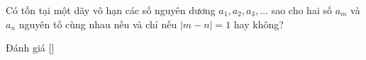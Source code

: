 \ifshowproblem
\begin{problem}\label{problem:RMM-2015-P1}
    Có tồn tại một dãy vô hạn các số nguyên dương \( a_1, a_2, a_3, \ldots \)
    sao cho hai số \( a_m \) và \( a_n \) nguyên tố cùng nhau nếu và chỉ nếu \( |m - n| = 1 \) hay không?
\end{problem}
\fi

\ifshowinfo
Đánh giá [\textbf{}]
\fi